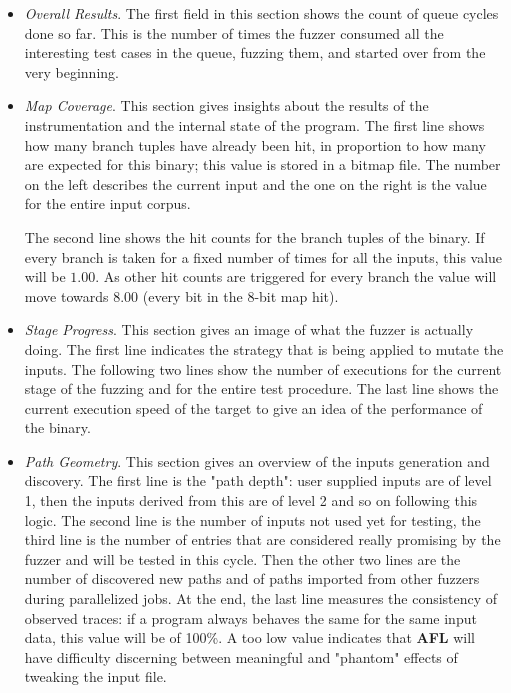 \documentclass[../main.tex]{subfiles}
\begin{document}
\begin{itemize}
  \item \textit{Overall Results}. The first field in this section shows the count of queue cycles done so far. This is the number of times the fuzzer consumed all the interesting test cases in the queue, fuzzing them, and started over from the very beginning.

  \item \textit{Map Coverage}. This section gives insights about the results of the instrumentation and the internal state of the program. The first line shows how many branch tuples have already been hit, in proportion to how many are expected for this binary; this value is stored in a bitmap file. The number on the left describes the current input and the one on the right is the value for the entire input corpus.

  The second line shows the hit counts for the branch tuples of the binary. If every branch is taken for a fixed number of times for all the inputs, this value will be  $1.00$. As other hit counts are triggered for every branch the value will move towards $8.00$ (every bit in the 8-bit map hit).

  \item \textit{Stage Progress}. This section gives an image of what the fuzzer is actually doing. The first line indicates the strategy that is being applied to mutate the inputs. The following two lines show the number of executions for the current stage of the fuzzing and for the entire test procedure. The last line shows the current execution speed of the target to give an idea of the performance of the binary.

  \item \textit{Path Geometry}. This section gives an overview of the inputs generation and discovery. The first line is the "path depth": user supplied inputs are of level 1, then the inputs derived from this are of level 2 and so on following this logic. The second line is the number of inputs not used yet for testing, the third line is the number of entries that are considered really promising by the fuzzer and will be tested in this cycle. Then the other two lines are the number of discovered new paths and of paths imported from other fuzzers during parallelized jobs. At the end, the last line measures the consistency of observed traces: if a program always behaves the same for the same input data, this value will be of 100\%. A too low value indicates that \textbf{AFL} will have difficulty discerning between meaningful and "phantom" effects of tweaking the input file.

\end{itemize}
\end{document}
